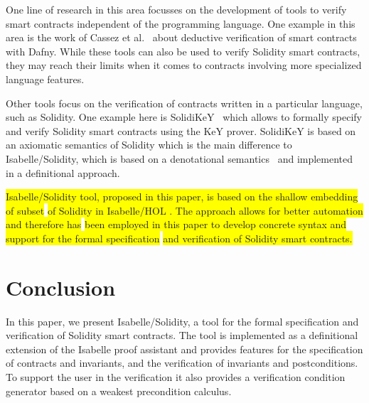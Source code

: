 \documentclass[a4paper,UKenglish,cleveref, autoref, thm-restate]{oasics-v2021}
\begin{document}
One line of research in this area focusses on the development of tools to verify smart contracts independent of the programming language.
One example in this area is the work of Cassez et al.~\cite{cassez22,cassez24} about deductive verification of smart contracts with Dafny.
While these tools can also be used to verify Solidity smart contracts, they may reach their limits when it comes to contracts involving more specialized language features.

Other tools focus on the verification of contracts written in a particular language, such as Solidity.
One example here is SolidiKeY~\cite{ahrendt2020functional} which allows to formally specify and verify Solidity smart contracts using the KeY prover.
SolidiKeY is based on an axiomatic semantics of Solidity which is the main difference to Isabelle/Solidity, which is based on a denotational semantics~\cite{marmsoler2022isabelle} and implemented in a definitional approach.
% 
 
 \colorbox{yellow}{Isabelle/Solidity tool, proposed in this paper, is based on the shallow embedding of subset} \colorbox{yellow}{ of Solidity in Isabelle/HOL  \cite{marmsoler2024secure}. The approach  allows for better automation and therefore has} \colorbox{yellow}{ been employed in this paper to develop concrete syntax and support for the formal specification} \colorbox{yellow}{ and verification of Solidity smart contracts. }
%


\section{Conclusion}
%
In this paper, we present Isabelle/Solidity, a tool for the formal specification and verification of Solidity smart contracts. 
The tool is implemented as a definitional extension of the Isabelle proof assistant and provides features for the specification of contracts and invariants, and the verification of invariants and postconditions.
To support the user in the verification it also provides a verification condition generator based on a weakest precondition calculus.
\end{document}
